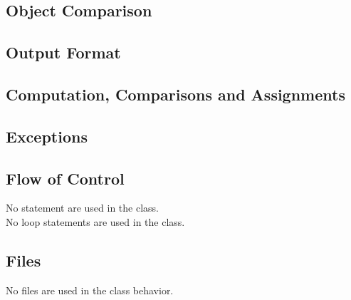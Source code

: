 \subsection{Object Comparison}
\subsection{Output Format}
\subsection{Computation, Comparisons and Assignments}
\subsection{Exceptions}
\subsection{Flow of Control}
No  statement are used in the class.\\
No loop statements are used in the class.
\subsection{Files}
No files are used in the class behavior.